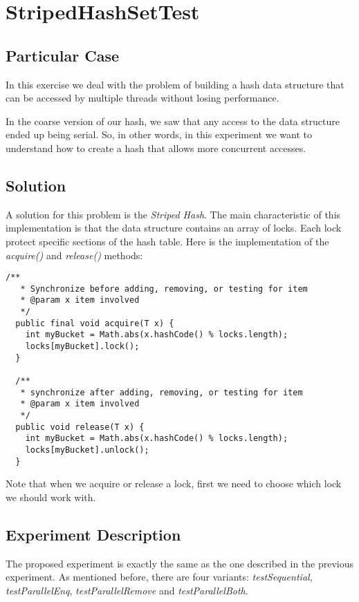 \section{\textbf{StripedHashSetTest}}
\subsection{Particular Case}
\par
In this exercise we deal with the problem of building a hash data structure that
can be accessed by multiple threads without losing performance. 
\par
In the coarse version of our hash, we saw that any access to the data structure
ended up being serial. So, in other words, in this experiment we want to
understand how to create a hash that allows more concurrent accesses.
\par
\subsection{Solution}
\par
A solution for this problem is the \textit{Striped Hash}. The main
characteristic of this implementation is that the data structure contains an
array of locks. Each lock protect specific sections of the hash table. Here is
the implementation of the \textit{acquire()} and \textit{release()} methods:
\par
\hfill
\begin{lstlisting}[style=numbers]
  /**
   * Synchronize before adding, removing, or testing for item
   * @param x item involved
   */
  public final void acquire(T x) {
    int myBucket = Math.abs(x.hashCode() % locks.length);
    locks[myBucket].lock();
  }

  /**
   * synchronize after adding, removing, or testing for item
   * @param x item involved
   */
  public void release(T x) {
    int myBucket = Math.abs(x.hashCode() % locks.length);
    locks[myBucket].unlock();
  }
\end{lstlisting}
\hfill
\par
Note that when we acquire or release a lock, first we need to choose which lock
we should work with. 
\par
\subsection{Experiment Description}
\par
The proposed experiment is exactly the same as the one described in the previous
experiment. As mentioned before, there are four variants:
\textit{testSequential}, \textit{testParallelEnq}, \textit{testParallelRemove}
and \textit{testParallelBoth}.
\par
